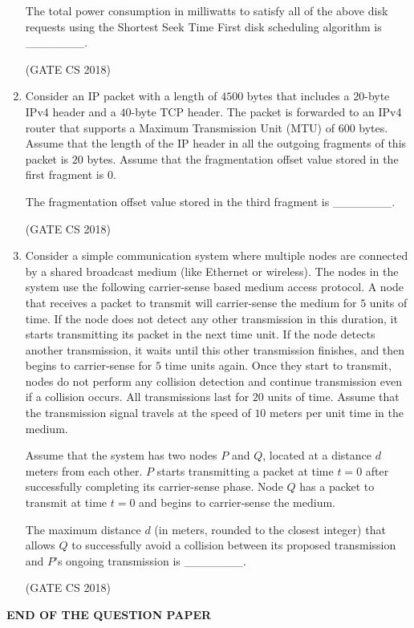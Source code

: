 \documentclass[12pt]{article}
\begin{document}
\begin{enumerate}
The total power consumption in milliwatts to satisfy all of the above disk requests using the Shortest Seek Time First disk scheduling algorithm is \_\_\_\_\_\_\_.  

(GATE CS 2018)

\item Consider an IP packet with a length of $4500$ bytes that includes a $20$-byte IPv4 header and a $40$-byte TCP header. The packet is forwarded to an IPv4 router that supports a Maximum Transmission Unit (MTU) of $600$ bytes. Assume that the length of the IP header in all the outgoing fragments of this packet is $20$ bytes. Assume that the fragmentation offset value stored in the first fragment is $0$.  

The fragmentation offset value stored in the third fragment is \_\_\_\_\_\_\_.  

(GATE CS 2018)

\item Consider a simple communication system where multiple nodes are connected by a shared broadcast medium (like Ethernet or wireless). The nodes in the system use the following carrier-sense based medium access protocol. A node that receives a packet to transmit will carrier-sense the medium for $5$ units of time. If the node does not detect any other transmission in this duration, it starts transmitting its packet in the next time unit. If the node detects another transmission, it waits until this other transmission finishes, and then begins to carrier-sense for $5$ time units again. Once they start to transmit, nodes do not perform any collision detection and continue transmission even if a collision occurs. All transmissions last for $20$ units of time. Assume that the transmission signal travels at the speed of $10$ meters per unit time in the medium.  

Assume that the system has two nodes $P$ and $Q$, located at a distance $d$ meters from each other. $P$ starts transmitting a packet at time $t=0$ after successfully completing its carrier-sense phase. Node $Q$ has a packet to transmit at time $t=0$ and begins to carrier-sense the medium.  

The maximum distance $d$ (in meters, rounded to the closest integer) that allows $Q$ to successfully avoid a collision between its proposed transmission and $P$’s ongoing transmission is \_\_\_\_\_\_\_.  

(GATE CS 2018)

\end{enumerate}

\begin{center}
    {\Large \textbf{END OF THE QUESTION PAPER}}
\end{center}
\end{document}

